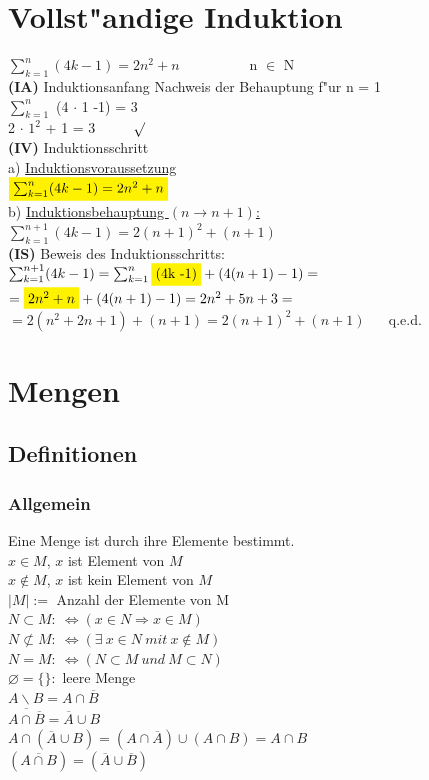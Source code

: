 \documentclass[10pt,a4paper,landscape]{article}
\begin{document}
\begin{multicols*}{3}
		\section{Vollst"andige Induktion}
		\begin{doublespace}
			$\sum_{k=1}^n (4k -1) = 2n^2 + n$  $\qquad$  $\qquad$ n $\in$ $\mathrm{N}$ \\
			\textbf{(IA)} Induktionsanfang Nachweis der Behauptung f"ur n = 1\\
			$\sum_{k=1}^n$ (4 $\cdot$ 1 -1) = 3\\
			2 $\cdot$ $1^2$ + 1 = 3 $\qquad$ $\surd$\\
			\textbf{(IV)} Induktionsschritt\\
			a) \uline{Induktionsvoraussetzung}\\
			$\colorbox{yellow}{$\sum_{k=1}^n (4k -1) = 2n^2 + n$}$\\
			b) \uline{Induktionsbehauptung $(n \rightarrow n + 1)$:}\\
			$\sum_{k=1}^{n+1} (4k -1) = 2(n+1)^2 + (n+1)$\\
			\textbf{(IS)} Beweis des Induktionsschritts:\\
			$\sum_{k=1}^{n+1} (4k -1) = \sum_{k=1}^n \colorbox{yellow}{(4k -1)} + (4(n + 1) -1) =$\\ 
			$= \colorbox{yellow}{$2n^2 + n$} + (4(n+1) -1) = 2n^2 +5n +3 =$\\
			$= 2(n^2 +2n +1) + (n+1) = 2(n+1)^2 + (n+1)$ $\quad$ q.e.d.
		\end{doublespace}
		
		\section{Mengen}
		\subsection{Definitionen}
		\subsubsection{Allgemein}
		Eine Menge ist durch ihre Elemente bestimmt.\\
		$x \in M$, $x$ ist Element von $M$\\
		$x \notin M$, $x$ ist kein Element von $M$\\
		$|M| :=$ Anzahl der Elemente von M\\
		$N \subset M:~\Leftrightarrow (x \in N \Rightarrow x \in M)$\\
		$N \not\subset M:~\Leftrightarrow (\exists~x \in N~mit~x \notin M)$\\
		$N = M:~\Leftrightarrow (N \subset M~und~M \subset N)$\\
		$\varnothing = \{\}: $ leere Menge\\
		$A \smallsetminus B = A \cap \overline{B}$\\
		$\overline{A \cap \overline{B}} = \overline{A} \cup B$\\
		$A \cap (\overline{A} \cup B) = (A\cap\overline{A})\cup(A\cap B)=A\cap B$\\
		$(\overline{A \cap B}) = (\overline{A} \cup \overline{B})$
		

\end{multicols*}
\end{document}
